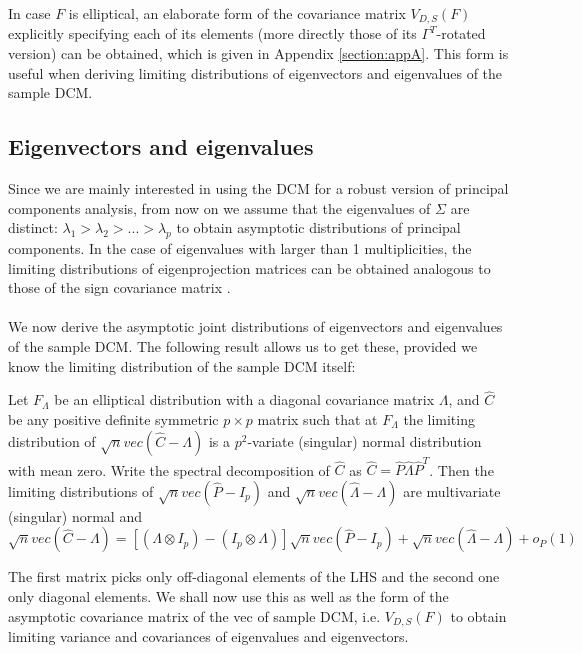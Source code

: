 \documentclass[fleqn,11pt]{article}
\begin{document}
In case $F$ is elliptical, an elaborate form of the covariance matrix $V_{D,S}(F)$ explicitly specifying each of its elements (more directly those of its $\Gamma^T$-rotated version) can be obtained, which is given in Appendix \ref{section:appA}. This form is useful when deriving limiting distributions of eigenvectors and eigenvalues of the sample DCM.

\subsection{Eigenvectors and eigenvalues} Since we are mainly interested in using the DCM for a robust version of principal components analysis, from now on we assume that the eigenvalues of $\Sigma$ are distinct: $\lambda_1 > \lambda_2 > ... > \lambda_p$ to obtain asymptotic distributions of principal components. In the case of eigenvalues with larger than 1 multiplicities, the limiting distributions of eigenprojection matrices can be obtained analogous to those of the sign covariance matrix \citep{magyar14}.

\paragraph{}We now derive the asymptotic joint distributions of eigenvectors and eigenvalues of the sample DCM. The following result allows us to get these, provided we know the limiting distribution of the sample DCM itself:

\begin{Theorem} \label{Theorem:decomp} \citep{taskinen12}
Let $F_\Lambda$ be an elliptical distribution with a diagonal covariance matrix $\Lambda$, and $\hat C$ be any positive definite symmetric $p \times p$ matrix such that at $F_\Lambda$ the limiting distribution of $\sqrt n vec(\hat C - \Lambda)$ is a $p^2$-variate (singular) normal distribution with mean zero. Write the spectral decomposition of $\hat C$ as $\hat C = \hat P \hat\Lambda \hat P^T$. Then the limiting distributions of $\sqrt n vec(\hat P - I_p)$ and $\sqrt n vec(\hat\Lambda - \Lambda)$ are multivariate (singular) normal and
%
\begin{equation} \label{equation:decompEq}
\sqrt n vec (\hat C - \Lambda)  = \left[ (\Lambda \otimes I_p) - (I_p \otimes \Lambda) \right] \sqrt n vec (\hat P - I_p) + \sqrt n vec (\hat\Lambda - \Lambda) + o_P(1)
\end{equation}
\end{Theorem}

The first matrix picks only off-diagonal elements of the LHS and the second one only diagonal elements. We shall now use this as well as the form of the asymptotic covariance matrix of the vec of sample DCM, i.e. $V_{D,S}(F)$ to obtain limiting variance and covariances of eigenvalues and eigenvectors.
\end{document}
